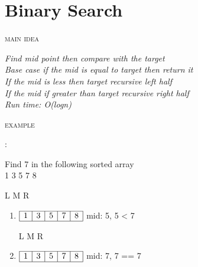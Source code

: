 \documentclass[12pt, letterpaper]{article}
\newcommand{\idea}[1]{
\noindent
\begin{minipage}[t]{0.15\textwidth}
	\textsc{main idea}
\end{minipage}
\hspace{-0.8cm}\vline\hspace{0.05cm}
\begin{minipage}[t]{0.88\textwidth}
	\textit{#1}
\end{minipage}\vspace{0.25cm}}
\newcommand{\example}[1]{
\noindent
\begin{minipage}[t]{0.02\textwidth}
	\textsc{example}
\end{minipage}
\hspace{1.6cm}:\hspace{0.05cm}
\begin{minipage}[t]{0.88\textwidth}
	\textnormal{#1}
\end{minipage}\vspace{0.25cm}}
\begin{document}
\section{Binary Search}
\idea{Find mid point then compare with the target\\
      Base case if the mid is equal to target then return it\\
	  If the mid is less then target recursive left half\\
	  If the mid if greater than target recursive right half\\
	  Run time: O(logn)}
\example{Find 7 in the following sorted array\\1 3 5 7 8}

\begin{minipage}{0.8\textwidth}
	\hspace{1.2cm}L
	\hspace{0.7cm}M
	\hspace{0.6cm}R
	\begin{enumerate}
		\item 
		$\begin{array}{|l|c|c|c|r|}
			\hline
			1 & 3 & 5 & 7 & 8 \\
			\hline
		\end{array}$
		mid: 5, 5 < 7
		
		\hspace{1.2cm}L
		\hspace{0.2cm}M
		\hspace{0.2cm}R
		
		\item 
		$\begin{array}{|l|c|c|c|c|r|}
			\hline
			1 & 3 & 5 & 7 & 8 \\
			\hline
		\end{array}$
		mid: 7, 7 == 7
	\end{enumerate}
\end{minipage}
\end{document}

